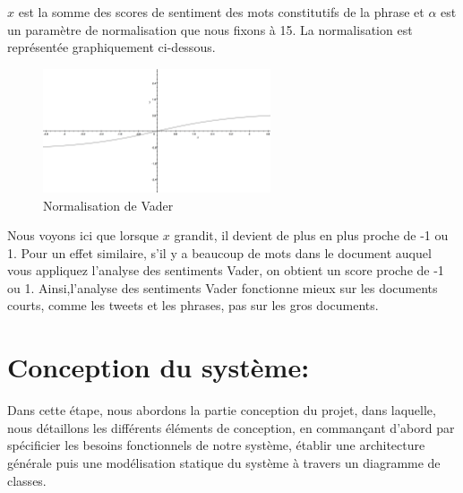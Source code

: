 $x$ est la somme des scores de sentiment des mots constitutifs de la phrase et $\alpha$ est un paramètre de normalisation que nous fixons à 15. La normalisation est représentée graphiquement ci-dessous.
\begin{figure}[H]
    \centering
    \includegraphics[width=0.6\textwidth]{chapitre2/assets/vader-normalization.png}
    \caption{Normalisation de Vader}
    \label{fig:my_label}
\end{figure}
Nous voyons ici que lorsque $x$ grandit, il devient de plus en plus proche de -1 ou 1. Pour un effet similaire, s'il y a beaucoup de mots dans le document auquel vous appliquez l'analyse des sentiments Vader, on obtient un score proche de -1 ou 1. Ainsi,l'analyse des sentiments Vader fonctionne mieux sur les documents courts, comme les tweets et les phrases, pas sur les gros documents.

\section{Conception du système:}
Dans cette étape, nous abordons la partie conception du projet, dans laquelle, nous
détaillons les différents éléments de conception, en commançant d'abord par spécificier les besoins fonctionnels de notre système, établir une architecture générale puis une modélisation statique du système à travers un diagramme de classes.
